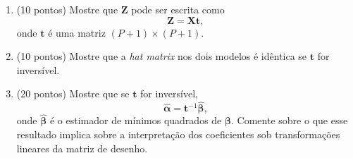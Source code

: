 \documentclass[a4paper,10pt, notitlepage]{report}
\newif\ifanswers
\begin{document}
\begin{enumerate}[label=\alph*)]
 \item (10 pontos) Mostre que $\boldsymbol{Z}$  pode ser escrita como 
 \begin{equation*}
     \boldsymbol{Z} = \boldsymbol{X}\boldsymbol{t},
 \end{equation*}
 onde $\boldsymbol{t}$ é uma matriz $(P + 1) \times (P + 1)$.
 \item (10 pontos)  Mostre que a \textit{hat matrix} nos dois modelos é idêntica se $\boldsymbol{t}$ for inversível.
 \item (20 pontos) Mostre que se $\boldsymbol{t}$ for inversível, 
 \begin{equation*}
     \widehat{\boldsymbol{\alpha}} = \boldsymbol{t}^{-1}\widehat{\boldsymbol{\beta}},
 \end{equation*}
 onde $\hat{\boldsymbol{\beta}}$ é o estimador de mínimos quadrados de $\boldsymbol{\beta}$.
 Comente sobre o que esse resultado implica sobre a interpretação dos coeficientes sob transformações lineares da matriz de desenho.
 \end{enumerate}

\ifanswers

\fi

% 
% 
\end{document}
